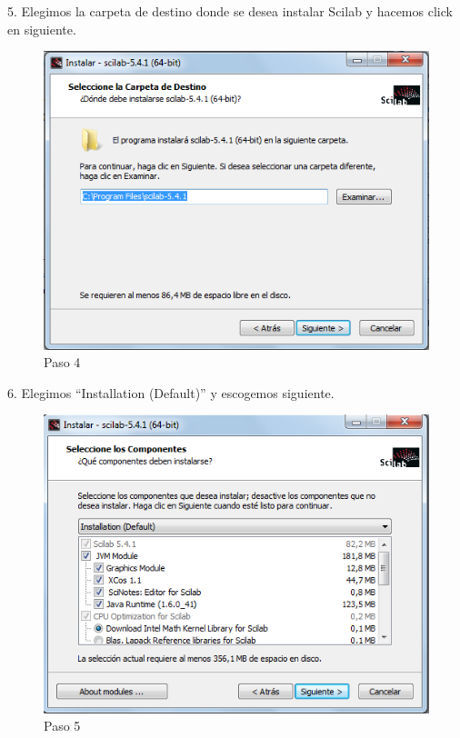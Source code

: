 \documentclass[11pt]{article} %
\begin{document}
5.	Elegimos la carpeta de destino donde se desea instalar Scilab y hacemos click en siguiente.

\begin{figure}
  \centering
    \includegraphics{Captura4}
  \caption{Paso 4}
  \label{fig:paso4}
\end{figure}

6.	Elegimos “Installation (Default)” y escogemos siguiente.

\begin{figure}
  \centering
    \includegraphics{Captura5}
  \caption{Paso 5}
  \label{fig:paso5}
\end{figure}
\end{document}
